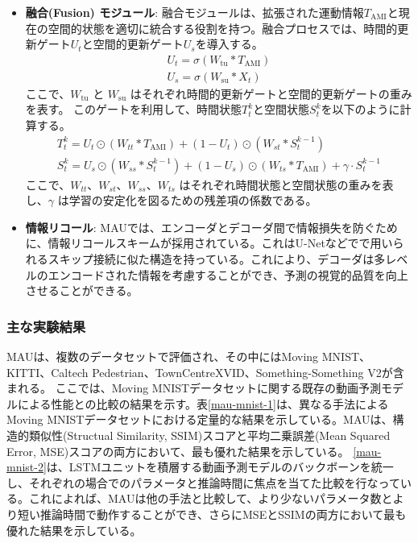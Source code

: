 \begin{itemize}
        \item \textbf{融合(Fusion) モジュール}: 融合モジュールは、拡張された運動情報\(T_{\text{AMI}} \)と現在の空間的状態を適切に統合する役割を持つ。融合プロセスでは、時間的更新ゲート\( U_t \)と空間的更新ゲート\( U_s \)を導入する。
        \begin{align}
          U_t = \sigma(W_{\text{tu}} \ast T_{\text{AMI}}) \\
          U_s = \sigma(W_{\text{su}} \ast X_t) 
        \end{align}
        ここで、\( W_{\text{tu}} \) と \( W_{\text{su}} \) はそれぞれ時間的更新ゲートと空間的更新ゲートの重みを表す。
        このゲートを利用して、時間状態\( T_{t}^{k} \)と空間状態\( S_{t}^{k} \)を以下のように計算する。
        \begin{align}
        T_{t}^{k} = U_t \odot (W_{tt} \ast T_{\text{AMI}}) + (1 - U_t) \odot (W_{st} \ast S_{t}^{k-1}) \\
        S_{t}^{k} = U_s \odot (W_{ss} \ast S_{t}^{k-1}) + (1 - U_s) \odot (W_{ts} \ast T_{\text{AMI}}) + \gamma \cdot S_{t}^{k-1}
        \end{align}
        ここで、\( W_{tt} \)、\( W_{st} \)、\( W_{ss} \)、\( W_{ts} \) はそれぞれ時間状態と空間状態の重みを表し、\( \gamma \) は学習の安定化を図るための残差項の係数である。

        \item \textbf{情報リコール}: 
          MAUでは、エンコーダとデコーダ間で情報損失を防ぐために、情報リコールスキームが採用されている。これはU-Netなどでで用いられるスキップ接続に似た構造を持っている。これにより、デコーダは多レベルのエンコードされた情報を考慮することができ、予測の視覚的品質を向上させることができる。    

       \end{itemize}

      \subsubsection{主な実験結果}
        MAUは、複数のデータセットで評価され、その中にはMoving MNIST、KITTI、Caltech Pedestrian、TownCentreXVID、Something-Something V2が含まれる。
        ここでは、Moving MNISTデータセットに関する既存の動画予測モデルによる性能との比較の結果を示す。表\ref{mau-mnist-1}は、異なる手法によるMoving MNISTデータセットにおける定量的な結果を示している。MAUは、構造的類似性(Structual Similarity, SSIM)スコアと平均二乗誤差(Mean Squared Error, MSE)スコアの両方において、最も優れた結果を示している。
        \ref{mau-mnist-2}は、LSTMユニットを積層する動画予測モデルのバックボーンを統一し、それぞれの場合でのパラメータと推論時間に焦点を当てた比較を行なっている。これによれば、MAUは他の手法と比較して、より少ないパラメータ数とより短い推論時間で動作することができ、さらにMSEとSSIMの両方において最も優れた結果を示している。

